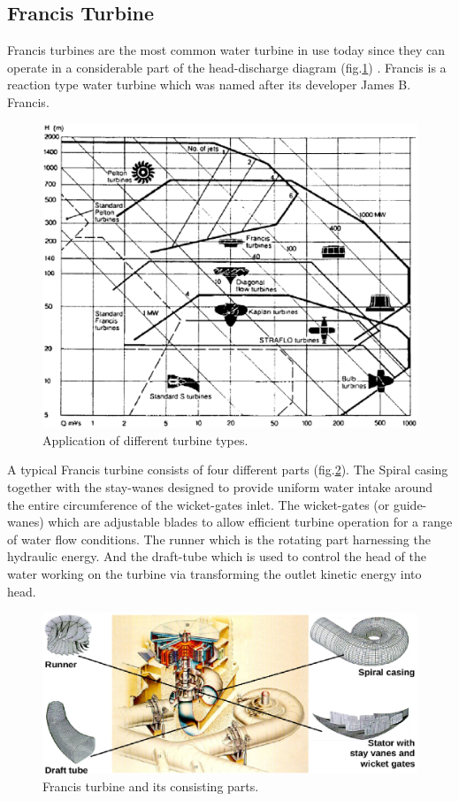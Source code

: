 \subsection{Francis Turbine}
Francis turbines are the most common water turbine in use today since they can operate in a considerable part of the head-discharge diagram (fig.\ref{range}) \cite{papanto}. Francis is a reaction type water turbine which was named after its developer James B. Francis. 

\begin{figure}[h!]
\centering
\includegraphics[width=140mm]{range2.eps} 
\caption{Application of different turbine types.}
\label{range}
\end{figure}

A typical Francis turbine consists of four different parts (fig.\ref{francis1}). The Spiral casing  together with the stay-wanes designed to provide uniform water intake around the entire circumference of the wicket-gates inlet. The wicket-gates (or guide-wanes) which are adjustable blades to allow efficient turbine operation for a range of water flow conditions. The runner which is the rotating part harnessing the hydraulic energy. And the draft-tube which is used to control the head of the water working on the turbine via transforming the outlet kinetic energy into head.

\begin{figure}[h!]
\centering
\includegraphics[width=150mm]{francis1.eps} 
\caption{Francis turbine and its consisting parts.}
\label{francis1}
\end{figure}

